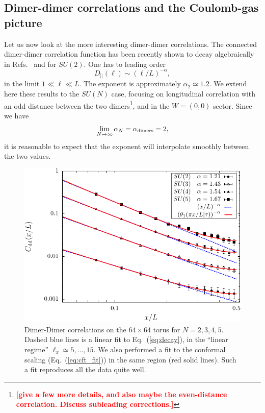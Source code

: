 \documentclass[11pt]{iopart}
\begin{document}
\subsection{Dimer-dimer correlations and the Coulomb-gas picture}
\label{sec:dimerdimer}
Let us now look at the more interesting dimer-dimer correlations. The connected dimer-dimer correlation function has been recently shown to decay algebraically in Refs.~\cite{RVB1} and \cite{RVB2} for $SU(2)$. One has to leading order
\begin{equation}\label{eq:decay}
 D_{||}(\ell) \sim (\ell/L)^{-\alpha},
\end{equation}
in the limit $1\ll \ell \ll L$.
The exponent is approximately $\alpha_2\simeq 1.2$. We extend here these results to the $SU(N)$ case, focusing on longitudinal correlation with an odd distance between the two dimers\footnote{\textcolor{red}{\bf [give a few more details, and also maybe the even-distance correlation. Discuss subleading corrections.]}}, and in the $W=(0,0)$ sector. Since we have
\begin{equation}
 \lim_{N \to \infty} \alpha_N=\alpha_{\rm dimers}=2,
\end{equation}
it is reasonable to expect that the exponent will interpolate smoothly between the two values. 
\begin{figure}[ht]
 \begin{center}
  \includegraphics{./figures/corr_su2.pdf}
 \end{center}
\caption{Dimer-Dimer correlations on the $64 \times 64$ torus for $N=2,3,4,5$. Dashed blue lines is a linear fit to Eq.~(\ref{eq:decay}), in the ``linear regime'' $\ell_x \simeq 5,\ldots,15$. We also performed a fit to the conformal scaling (Eq.~(\ref{eq:cft_fit})) in the same region (red solid lines). Such a fit reproduces all the data quite well.}
\label{fig:corr_su2_dimers}
\end{figure}
\end{document}
